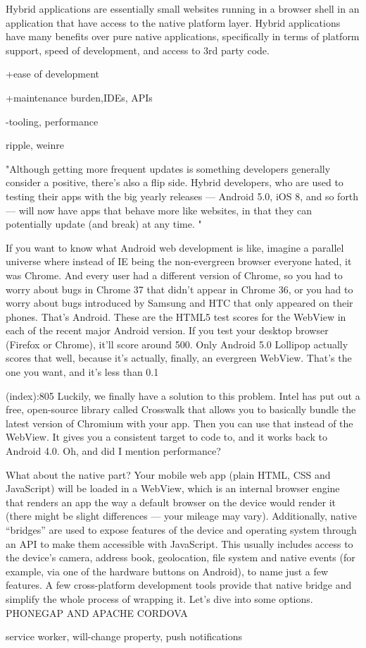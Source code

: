 \documentclass[thesis.tex]{subfiles}
\begin{document}
Hybrid applications are essentially small websites running in a browser shell in an application that have access to the native platform layer. Hybrid applications have many benefits over pure native applications, specifically in terms of platform support, speed of development, and access to 3rd party code.

+ease of development

+maintenance burden,IDEs, APIs

-tooling, performance

ripple, weinre

"Although getting more frequent updates is something developers generally consider a positive, there’s also a flip side. Hybrid developers, who are used to testing their apps with the big yearly releases — Android 5.0, iOS 8, and so forth — will now have apps that behave more like websites, in that they can potentially update (and break) at any time. "

If you want to know what Android web development is like, imagine a parallel
universe where instead of IE being the non-evergreen browser everyone hated,
it was Chrome. And every user had a different version of Chrome, so you had
to worry about bugs in Chrome 37 that didn't appear in Chrome 36, or you had to
worry about bugs introduced by Samsung and HTC that only appeared on their phones.
That's Android.
These are the HTML5 test scores for the WebView in each of the recent
major Android version. If you test your desktop browser (Firefox or Chrome), it'll
score around 500. Only Android 5.0 Lollipop actually scores that well, because
it's actually, finally, an evergreen WebView. That's the one you want, and it's less
than 0.1%

(index):805
Luckily, we finally have a solution to this problem. Intel has put out
a free, open-source library called Crosswalk that allows you to basically
bundle the latest version of Chromium with your app. Then you can use
that instead of the WebView. It gives you a consistent target to code to,
and it works back to Android 4.0.
Oh, and did I mention performance?

What about the native part? Your mobile web app (plain HTML, CSS and JavaScript) will be loaded in a WebView, which is an internal browser engine that renders an app the way a default browser on the device would render it (there might be slight differences — your mileage may vary). Additionally, native “bridges” are used to expose features of the device and operating system through an API to make them accessible with JavaScript. This usually includes access to the device’s camera, address book, geolocation, file system and native events (for example, via one of the hardware buttons on Android), to name just a few features.
A few cross-platform development tools provide that native bridge and simplify the whole process of wrapping it. Let’s dive into some options.
PHONEGAP AND APACHE CORDOVA


service worker, will-change property, push notifications
\end{document}
